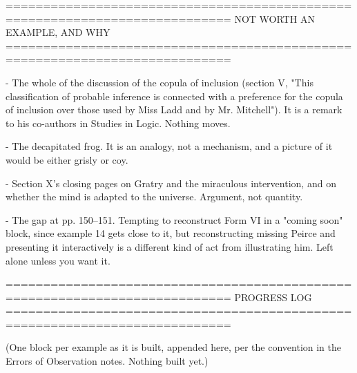 ============================================================================
NOT WORTH AN EXAMPLE, AND WHY
============================================================================

- The whole of the discussion of the copula of inclusion (section V, "This
  classification of probable inference is connected with a preference for the
  copula of inclusion over those used by Miss Ladd and by Mr. Mitchell"). It is
  a remark to his co-authors in Studies in Logic. Nothing moves.

- The decapitated frog. It is an analogy, not a mechanism, and a picture of it
  would be either grisly or coy.

- Section X's closing pages on Gratry and the miraculous intervention, and on
  whether the mind is adapted to the universe. Argument, not quantity.

- The gap at pp. 150–151. Tempting to reconstruct Form VI in a "coming soon"
  block, since example 14 gets close to it, but reconstructing missing Peirce
  and presenting it interactively is a different kind of act from illustrating
  him. Left alone unless you want it.


============================================================================
PROGRESS LOG
============================================================================

(One block per example as it is built, appended here, per the convention in the
Errors of Observation notes. Nothing built yet.)
